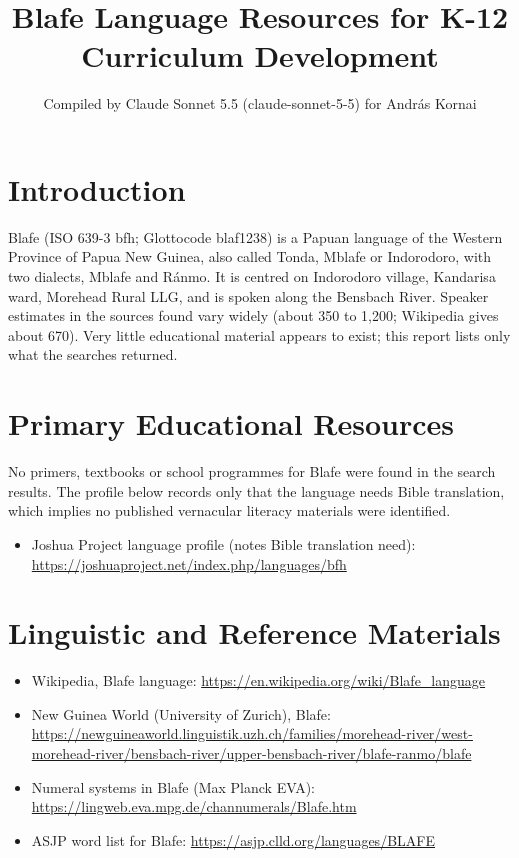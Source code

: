 \documentclass[12pt]{article}
\title{Blafe Language Resources for K-12 Curriculum Development}
\author{Compiled by Claude Sonnet 5.5 (claude-sonnet-5-5) for Andr\'as Kornai}
\date{}
\begin{document}
\maketitle

\section{Introduction}
Blafe (ISO 639-3 bfh; Glottocode blaf1238) is a Papuan language of the Western Province of Papua New Guinea, also called Tonda, Mblafe or Indorodoro, with two dialects, Mblafe and R\'anmo. It is centred on Indorodoro village, Kandarisa ward, Morehead Rural LLG, and is spoken along the Bensbach River. Speaker estimates in the sources found vary widely (about 350 to 1,200; Wikipedia gives about 670). Very little educational material appears to exist; this report lists only what the searches returned.

\section{Primary Educational Resources}
No primers, textbooks or school programmes for Blafe were found in the search results. The profile below records only that the language needs Bible translation, which implies no published vernacular literacy materials were identified.
\begin{itemize}
\item Joshua Project language profile (notes Bible translation need): \url{https://joshuaproject.net/index.php/languages/bfh}
\end{itemize}

\section{Linguistic and Reference Materials}
\begin{itemize}
\item Wikipedia, Blafe language: \url{https://en.wikipedia.org/wiki/Blafe_language}
\item New Guinea World (University of Zurich), Blafe: \url{https://newguineaworld.linguistik.uzh.ch/families/morehead-river/west-morehead-river/bensbach-river/upper-bensbach-river/blafe-ranmo/blafe}
\item Numeral systems in Blafe (Max Planck EVA): \url{https://lingweb.eva.mpg.de/channumerals/Blafe.htm}
\item ASJP word list for Blafe: \url{https://asjp.clld.org/languages/BLAFE}
\end{itemize}
\end{document}
